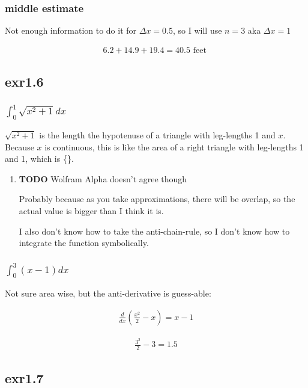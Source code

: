 \documentclass[letterpaper]{article}
\begin{document}
\subsubsection{middle estimate}
\label{sec:orgc5ac8ff}
Not enough information to do it for \(\Delta x = 0.5\), so I will use \(n=3\) aka \(\Delta x = 1\)

\[\begin{aligned}
    6.2 + 14.9 + 19.4 = 40.5 \text{ feet }
	\end{aligned}\]

\subsection{exr1.6}
\label{sec:org89a76d1}

\subsubsection{\(\int_0^1 \sqrt{x^2+1}dx\)}
\label{sec:org34bf266}
\(\sqrt{x^2+1}\) is the length the hypotenuse of a triangle with leg-lengths 1 and \(x\). Because \(x\) is continuous, this is like the area of a right triangle with leg-lengths 1 and 1, which is \boxed\{\}.


\begin{enumerate}
\item {\bfseries\sffamily TODO} Wolfram Alpha doesn't agree though
\label{sec:orgd4ad53d}

Probably because as you take approximations, there will be overlap, so the actual value is bigger than I think it is.

I also don't know how to take the anti-chain-rule, so I don't know how to integrate the function symbolically.
\end{enumerate}

\subsubsection{\(\int_0^3 (x-1)dx\)}
\label{sec:orgfb217c5}
Not sure area wise, but the anti-derivative is guess-able:

\[\begin{aligned}
    \frac{d}{dx}\left( \frac{x^2}{2} -x\right) = x-1
	\end{aligned}\]


\[\begin{aligned}
    \frac{3^2}{2}-3 = 1.5
	\end{aligned}\]

\subsection{exr1.7}
\label{sec:org63be5a8}
\end{document}
